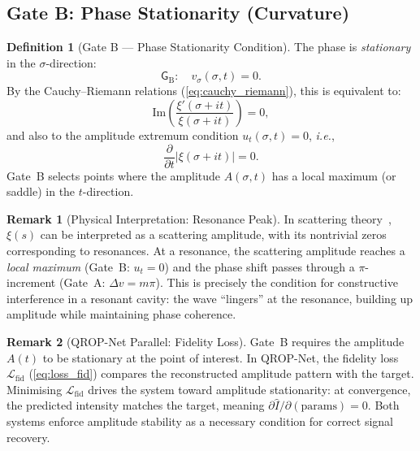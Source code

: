 \documentclass[11pt, a4paper]{article}
\theoremstyle{definition}
\newtheorem{definition}{Definition}[section]
\newtheorem{remark}{Remark}[section]
\theoremstyle{plain}
\newcommand{\ie}{\textit{i.e.}}
\newcommand{\xif}{\xi}                      %
\newcommand{\Ampl}{A}                       %
\newcommand{\GateB}{\mathsf{G}_{\mathrm{B}}}
\begin{document}
\subsection{Gate B: Phase Stationarity (Curvature)}

\begin{definition}[Gate B --- Phase Stationarity Condition]
\label{def:gate_b}
The phase is \textit{stationary} in the $\sigma$-direction:
\begin{equation}
\boxed{
  \GateB: \quad v_\sigma(\sigma, t) = 0.
}
\label{eq:gate_b}
\end{equation}
By the Cauchy--Riemann relations (\cref{eq:cauchy_riemann}), this is
equivalent to:
\begin{equation}
  \mathrm{Im}\!\left(\frac{\xif'(\sigma+it)}{\xif(\sigma+it)}\right) = 0,
  \label{eq:gate_b_cr}
\end{equation}
and also to the amplitude extremum condition $u_t(\sigma,t) = 0$, \ie,
\begin{equation}
  \frac{\partial}{\partial t}|\xif(\sigma + it)| = 0.
  \label{eq:amplitude_extremum}
\end{equation}
Gate~B selects points where the amplitude $\Ampl(\sigma,t)$ has a local
maximum (or saddle) in the $t$-direction.
\end{definition}

\begin{remark}[Physical Interpretation: Resonance Peak]
\label{rem:resonance_peak}
In scattering theory~\cite{khare1997}, $\xif(s)$ can be interpreted as
a scattering amplitude, with its nontrivial zeros corresponding to
resonances. At a resonance, the scattering amplitude reaches a
\textit{local maximum} (Gate~B: $u_t = 0$) and the phase shift
passes through a $\pi$-increment (Gate~A: $\Delta v = m\pi$). This is
precisely the condition for constructive interference in a resonant
cavity: the wave ``lingers'' at the resonance, building up amplitude
while maintaining phase coherence.
\end{remark}

\begin{remark}[QROP-Net Parallel: Fidelity Loss]
\label{rem:gate_b_parallel}
Gate~B requires the amplitude $\Ampl(t)$ to be stationary at the point
of interest. In QROP-Net, the fidelity loss $\mathcal{L}_{\mathrm{fid}}$
(\cref{eq:loss_fid}) compares the reconstructed amplitude pattern with
the target. Minimising $\mathcal{L}_{\mathrm{fid}}$ drives the system
toward amplitude stationarity: at convergence, the predicted intensity
matches the target, meaning $\partial \hat{I}/\partial(\text{params}) = 0$.
Both systems enforce amplitude stability as a necessary condition for
correct signal recovery.
\end{remark}
\end{document}
